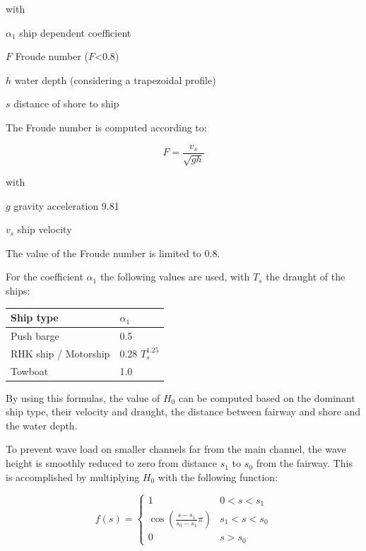 with

\begin{symbollist}
\item[$\alpha_1$] ship dependent coefficient \unitbrackets{-}
\item[$F$] Froude number ($F$<0.8) \unitbrackets{-}
\item[$h$] water depth (considering a  trapezoidal profile) 
\item[$s$] distance of shore to ship 
\end{symbollist}

The Froude number is computed according to:

\begin{equation}
F = \frac{v_s}{\sqrt{g h}}
\end{equation}

with

\begin{symbollist}
\item[$g$] gravity acceleration 9.81 
\item[$v_s$] ship velocity 
\end{symbollist}

The value of the Froude number is limited to 0.8.

For the coefficient $\alpha_1$ the following values are used, with $T_s$  the draught of the ships:

\begin{tabular}{ll}
Ship type & $\alpha_1$ \\ \hline
Push barge & 0.5 \\
RHK ship / Motorship & 0.28 $T_s^\text{1.25}$ \\
Towboat & 1.0 \\ \hline
\end{tabular}

By using this formulas, the value of $H_0$ can be computed based on the dominant ship type, their velocity and draught, the distance between fairway and shore and the water depth.

To prevent wave load on smaller channels far from the main channel, the wave height is smoothly reduced to zero from distance $s_1$ to $s_0$ from the fairway.
This is accomplished by multiplying $H_0$ with the following function:

\begin{equation}
f(s) = \left \{ \begin{matrix}
1 & 0 < s < s_1 \\
\cos \left ( \frac{s - s_1}{s_0 - s_1} \pi \right ) & s_1 < s < s_0 \\
0 & s > s_0
\end{matrix} \right .
\end{equation}

